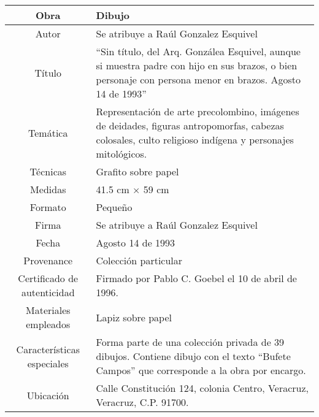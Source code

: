 \begin{table}[H]
\centering
\begin{tabular}{|c|m{}|}
\hline
Obra& Dibujo	\\
\hline
Autor & Se atribuye a Ra\'ul Gonzalez Esquivel\\
\hline
T\'itulo & ``Sin t\'itulo, del Arq. Gonz\'alea Esquivel, aunque si muestra padre con hijo en sus brazos, o bien personaje con persona menor en brazos. Agosto 14 de 1993'' \\
\hline
Tem\'atica & Representaci\'on de arte precolombino, im\'agenes de deidades, figuras antropomorfas, cabezas colosales, culto religioso ind\'igena y personajes mitol\'ogicos.\\
\hline
T\'ecnicas &Grafito sobre papel \\
\hline
Medidas & 41.5 cm $\times$ 59 cm \\
\hline
 Formato & Peque\~no \\
 \hline
 Firma & Se atribuye a Ra\'ul Gonzalez Esquivel\\ 
 \hline
  Fecha &  Agosto 14 de 1993\\
 \hline
 Provenance & Colecci\'on particular\\
 \hline
 Certificado de autenticidad& Firmado por Pablo C. Goebel el 10 de abril de 1996.  \\
 \hline 
  Materiales empleados & Lapiz sobre papel\\
 \hline
 Caracter\'isticas especiales & Forma parte de una colecci\'on privada de 39 dibujos. 
Contiene dibujo con el texto ``Bufete Campos'' que corresponde a la obra por encargo. \\
\hline 
Ubicaci\'on & Calle Constituci\'on 124, colonia Centro, Veracruz, Veracruz, C.P. 91700.\\
\hline

\end{tabular}
\end{table}

